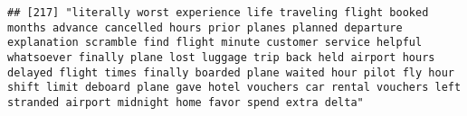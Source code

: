 \documentclass[
]{article}
\begin{document}
\begin{verbatim}
## [217] "literally worst experience life traveling flight booked months advance cancelled hours prior planes planned departure explanation scramble find flight minute customer service helpful whatsoever finally plane lost luggage trip back held airport hours delayed flight times finally boarded plane waited hour pilot fly hour shift limit deboard plane gave hotel vouchers car rental vouchers left stranded airport midnight home favor spend extra delta"                                                                                                                                                                                                                                                                                                                                                                                                                                                                                                                                                                                                                                                                                                                                                                                                                                                                                                                                                                                                                                                                                                                                                                                                                                                                                                                                 

\end{verbatim}
\end{document}
